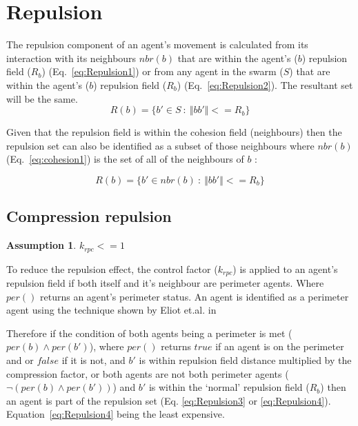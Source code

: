 \documentclass[12pt,a4paper]{article}
\newtheorem{assumption}{Assumption}
\newcommand{\magn}[1]{\Vert{#1}\Vert}
\begin{document}
\section{Repulsion}\label{repulsion}
The repulsion component of an agent's movement is calculated from its interaction with its neighbours $nbr(b)$ that are within the agent's ($b$) repulsion field ($R_b$) (Eq.~\ref{eq:Repulsion1}) or from any agent in the swarm ($S$) that are within the agent's ($b$) repulsion field ($R_b$) (Eq.~\ref{eq:Repulsion2}). The resultant set will be the same.\\

\begin{equation}\label{eq:Repulsion1}
R(b) = \{b' \in S~:~\magn{bb'} <= R_b\}
\end{equation}

Given that the repulsion field is within the cohesion field (neighbours) then the repulsion set can also be identified as a subset of those neighbours where $nbr(b)$ (Eq.~\ref{eq:cohesion1}) is the set of all of the neighbours of $b$ \cite{eliot2017methods}:

\begin{equation}\label{eq:Repulsion2}
R(b) = \{b' \in nbr(b)~:~\magn{bb'} <= R_b\}
\end{equation}

\subsection{Compression repulsion}

\begin{assumption}
	$k_{rpc} <= 1$
\end{assumption}

To reduce the repulsion effect, the control factor ($k_{rpc}$) is applied to an agent's repulsion field if both itself and it's neighbour are perimeter agents. Where $per()$ returns an agent's perimeter status. An agent is identified as a perimeter agent using the technique shown by Eliot et.al. in \cite{eliot2019void}

Therefore if the condition of both agents being a perimeter is met ($per(b)\wedge per(b')$), where $per()$ returns $true$ if an agent is on the perimeter and or $false$ if it is not, and $b'$ is within repulsion field distance multiplied by the compression factor, or both agents are not both perimeter agents ($\neg(per(b)\wedge per(b'))$) and $b'$ is within the `normal' repulsion field ($R_b$) then an agent is part of the repulsion set (Eq. \ref{eq:Repulsion3} or \ref{eq:Repulsion4}). Equation~\ref{eq:Repulsion4} being the least expensive.
\end{document}
